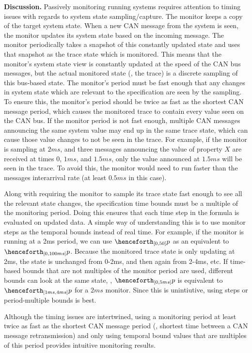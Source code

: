 
\textbf{Discussion. }
Passively monitoring running systems requires attention to timing issues with regards to system state sampling/capture.
%
The monitor keeps a copy of the target system state. When a new CAN message from the system is seen, the monitor updates its system state based on the incoming message. The monitor periodically takes a snapshot of this constantly updated state and uses that snapshot as the trace state which is monitored.
%
This means that the monitor's system state view is constantly updated at the speed of the CAN bus messages, but the actual monitored state (\ie, the trace) is a discrete sampling of this bus-based state.
The monitor's period must be fast enough that any changes in system state which are relevant to the specification are seen by the sampling.
To ensure this, the monitor's period should be twice as fast as the shortest CAN message period, which causes the monitored trace to contain every value seen on the CAN bus.
If the monitor period is not fast enough, multiple CAN messages announcing the same system value may end up in the same trace state, which can cause those value changes to not be seen in the trace.
For example, if the monitor is sampling at $2ms$, and three messages announcing the value of property $X$ are received at times $0$, $1ms$, and $1.5ms$, only the value announced at $1.5ms$ will be seen in the trace. To avoid this, the monitor would need to run faster than the messages interarrival rate (at least $0.5ms$ in this case).

Along with requiring the monitor to sample its trace state fast enough to see all the relevant state changes, the specification time bounds must be a multiple of the monitoring period.
Doing this ensures that each time step in the formula is evaluated on updated data.
A simple way of understanding this is to use monitor steps as the temporal bounds instead of real time.
For example, if the monitor is running at a 2ms period, we can use $\henceforth_{[0,50]} p$ as an equivalent to $\henceforth_{[0,100ms]} p$.
Because the monitored trace state is only updating at 2ms, the state is unchanged from 0-2ms, and then again from 2-4ms, etc.
If time-based bounds that are not multiples of the monitor period are used, different bounds can look at the same state, \eg, $\henceforth_{[0,5ms]} p$ is equivalent to $\henceforth_{[1ms,4ms]} p$ for a $2ms$ monitor. Since this is unintiutive, using steps or period-multiple bounds is best.

Although the timing issues are intertwined, using a monitoring period at least twice as fast as the shortest CAN message period (\ie, shortest time between a CAN message retransmission) and only using temporal bound values that are multiples of this period provides intuitive monitoring results.


